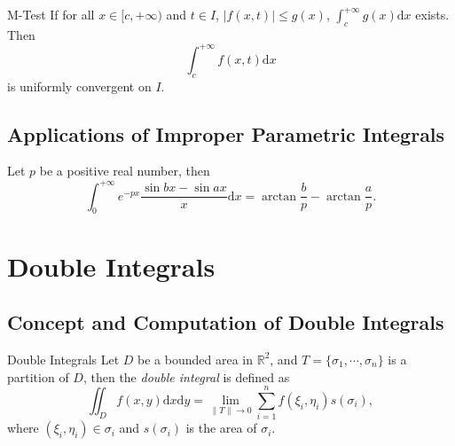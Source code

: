 \begin{proposition}{M-Test}{}
  If for all $x \in [c, +\infty)$ and $t \in I$, $|f(x, t)| \leq g(x)$,
  $\int_c^{+\infty} g(x)\mathrm{d} x$ exists. Then
  \begin{equation}
    \int_c^{+\infty} f(x, t)\mathrm{d} x
  \end{equation}
  is uniformly convergent on $I$.
\end{proposition}

\subsection{Applications of Improper Parametric Integrals}

\begin{proposition}{}{}
  Let $p$ be a positive real number, then
  \begin{equation}
    \int_0^{+\infty} e^{-px} \frac{\sin bx - \sin ax}{x} \mathrm{d} x
    = \arctan \frac{b}{p} - \arctan \frac{a}{p}.
  \end{equation}
\end{proposition}

\section{Double Integrals}

\subsection{Concept and Computation of Double Integrals}

\begin{definition}{Double Integrals}{}
  Let $D$ be a bounded area in $\mathbb{R}^2$,
  and $T = \{\sigma_1,\cdots,\sigma_n\}$ is a partition of $D$,
  then the \emph{double integral} is defined as
  \begin{equation}
    \iint_D f(x,y)\mathrm{d}x \mathrm{d}y = \lim \limits _{\|T\|\rightarrow 0} \sum\limits_{i = 1}^n f(\xi_i, \eta_i) s(\sigma_i),
  \end{equation}
  where $(\xi_i, \eta_i) \in \sigma_i$ and $s(\sigma_i)$ is the area of $\sigma_i$.
\end{definition}

